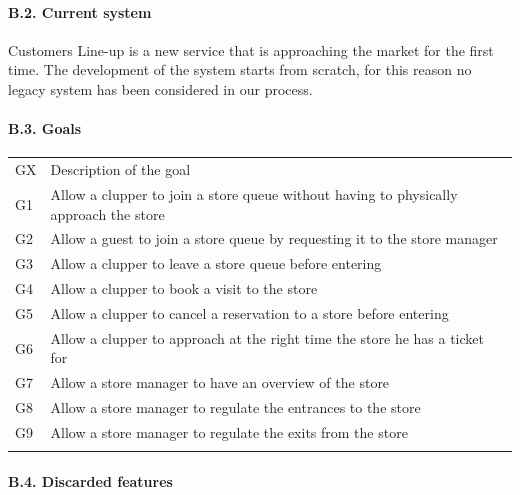 \documentclass[
]{article}
\begin{document}
\hypertarget{b.2.-current-system}{%
\paragraph{B.2. Current system}\label{b.2.-current-system}}

Customers Line-up is a new service that is approaching the market for
the first time. The development of the system starts from scratch, for
this reason no legacy system has been considered in our process.

\hypertarget{b.3.-goals}{%
\paragraph{B.3. Goals}\label{b.3.-goals}}

\begin{longtable}[]{@{}
  >{\raggedright\arraybackslash}p{}
  >{\raggedright\arraybackslash}p{}@{}}
\toprule
GX & Description of the goal \\ \addlinespace
\midrule
\endhead
G1 & Allow a clupper to join a store queue without having to physically
approach the store \\ \addlinespace
G2 & Allow a guest to join a store queue by requesting it to the store
manager \\ \addlinespace
G3 & Allow a clupper to leave a store queue before
entering \\ \addlinespace
G4 & Allow a clupper to book a visit to the store \\ \addlinespace
G5 & Allow a clupper to cancel a reservation to a store before
entering \\ \addlinespace
G6 & Allow a clupper to approach at the right time the store he has a
ticket for \\ \addlinespace
G7 & Allow a store manager to have an overview of the
store \\ \addlinespace
G8 & Allow a store manager to regulate the entrances to the
store \\ \addlinespace
G9 & Allow a store manager to regulate the exits from the
store \\ \addlinespace
\bottomrule
\end{longtable}

\hypertarget{b.4.-discarded-features}{%
\paragraph{B.4. Discarded features}\label{b.4.-discarded-features}}
\end{document}

